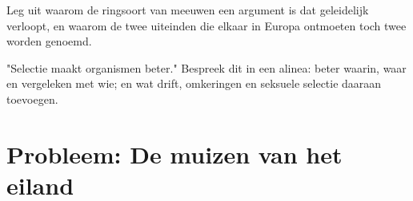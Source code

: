 \begin{exercise}[$\star\star\star$]\label{exo:g12:selection-drift-speciation:14}
Leg uit waarom de ringsoort van meeuwen een argument is dat 
geleidelijk verloopt, en waarom de twee uiteinden die elkaar in Europa
ontmoeten toch twee  worden genoemd.
\end{exercise}

\begin{exercise}[$\star\star\star$]\label{exo:g12:selection-drift-speciation:15}
"Selectie maakt organismen beter." Bespreek dit in een alinea: beter waarin,
waar en vergeleken met wie; en wat drift, omkeringen en seksuele selectie
daaraan toevoegen.
\end{exercise}

\section{Probleem: De muizen van het eiland}

